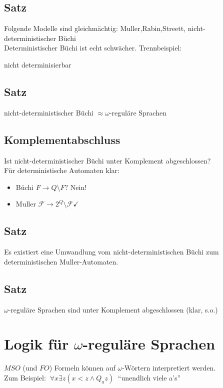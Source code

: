     \subsection{Satz}
        Folgende Modelle sind gleichmächtig: Muller,Rabin,Streett, nicht-deterministischer Büchi\\
        Deterministischer Büchi ist echt schwächer. Trennbeispiel:\\
         \hspace{1cm}nicht determinisierbar
    \subsection{Satz}
        nicht-deterministischer Büchi $\approx\omega$-reguläre Sprachen
    \subsection{Komplementabschluss}
        Ist nicht-deterministischer Büchi unter Komplement abgeschlossen?\\
        Für deterministische Automaten klar:
        \begin{itemize}
            \item Büchi $F\rightarrow Q\setminus F?$ Nein!
            \item Muller $\mathcal{F}\rightarrow 2^Q\setminus\mathcal{F} \checkmark$
        \end{itemize}
    \subsection{Satz}
        Es existiert eine Umwandlung vom nicht-deterministischen Büchi zum deterministischen Muller-Automaten.
    \subsection{Satz}
        $\omega$-reguläre Sprachen sind unter Komplement abgeschlossen (klar, s.o.)
\section{Logik für $\omega$-reguläre Sprachen}
    $MSO$ (und $FO$) Formeln können auf $\omega$-Wörtern interpretiert werden.\\
    Zum Beispiel: $\ \forall x\exists z (x<z\wedge Q_az)\ $ ``unendlich viele a's''
